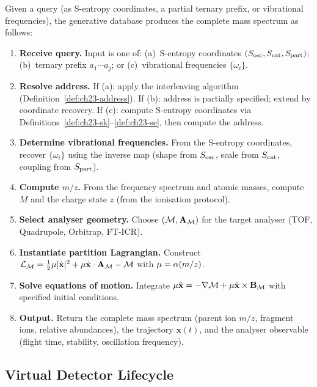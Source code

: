 \begin{definition}
\label{def:ch23-protocol}
Given a query (as S-entropy coordinates, a partial ternary prefix, or
vibrational frequencies), the generative database produces the complete mass
spectrum as follows:
\begin{enumerate}
  \item \textbf{Receive query.}  Input is one of: (a)~S-entropy coordinates
    $(S_{\mathrm{osc}}, S_{\mathrm{cat}}, S_{\mathrm{part}})$; (b)~ternary prefix $a_1 \cdots a_j$; or (c)~vibrational
    frequencies $\{\omega_i\}$.
  \item \textbf{Resolve address.}  If (a): apply the interleaving algorithm
    (Definition~\ref{def:ch23-address}).  If (b): address is partially
    specified; extend by coordinate recovery.  If (c): compute S-entropy
    coordinates via Definitions~\ref{def:ch23-sk}--\ref{def:ch23-se}, then
    compute the address.
  \item \textbf{Determine vibrational frequencies.}  From the S-entropy
    coordinates, recover $\{\omega_i\}$ using the inverse map (shape from $S_{\mathrm{osc}}$,
    scale from $S_{\mathrm{cat}}$, coupling from $S_{\mathrm{part}}$).
  \item \textbf{Compute $m/z$.}  From the frequency spectrum and atomic masses,
    compute $M$ and the charge state $z$ (from the ionisation protocol).
  \item \textbf{Select analyser geometry.}  Choose $(\mathcal{M}, \mathbf{A}_{\mathcal{M}})$
    for the target analyser (TOF, Quadrupole, Orbitrap, FT-ICR).
  \item \textbf{Instantiate partition Lagrangian.}  Construct
    $\mathcal{L}_{\mathcal{M}} = \tfrac{1}{2}\mu|\dot{\mathbf{x}}|^2 +
    \mu\dot{\mathbf{x}} \cdot \mathbf{A}_{\mathcal{M}} - \mathcal{M}$ with
    $\mu = \alpha(m/z)$.
  \item \textbf{Solve equations of motion.}  Integrate
    $\mu\ddot{\mathbf{x}} = -\nabla\mathcal{M} +
    \mu\dot{\mathbf{x}} \times \mathbf{B}_{\mathcal{M}}$ with specified
    initial conditions.
  \item \textbf{Output.}  Return the complete mass spectrum (parent ion $m/z$,
    fragment ions, relative abundances), the trajectory $\mathbf{x}(t)$, and
    the analyser observable (flight time, stability, oscillation frequency).
\end{enumerate}
\end{definition}

\subsection{Virtual Detector Lifecycle}
\label{sec:ch23-virtual-detector}

